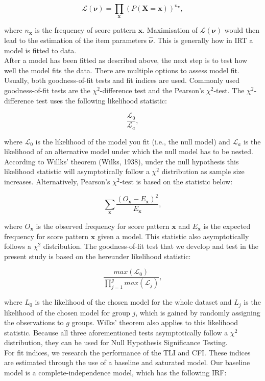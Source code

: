 \documentclass[Royal,sageapa,times,doublespace]{sagej}
\begin{document}
\begin{equation}
\mathcal{L}(\boldsymbol{\nu}) = \prod_{\boldsymbol{x}} (P(\boldsymbol{X} = \boldsymbol{x}))^{n_{\boldsymbol{x}}},
\end{equation}

where $n_{\boldsymbol{x}}$ is the frequency of score pattern $\boldsymbol{x}$. Maximisation of $\mathcal{L}(\boldsymbol{\nu})$ would then lead to the estimation of the item parameters $\boldsymbol{\hat{\nu}}$. This is generally how in IRT a model is fitted to data. \\
\indent After a model has been fitted as described above, the next step is to test how well the model fits the data. There are multiple options to assess model fit. Usually, both goodness-of-fit tests and fit indices are used. Commonly used goodness-of-fit tests are the $\chi^2$-difference test and the Pearson's $\chi^2$-test. The $\chi^2$-difference test uses the following likelihood statistic:

\begin{equation}
\frac{\mathcal{L}_0}{\mathcal{L}_a},
\end{equation}

where $\mathcal{L}_0$ is the likelihood of the model you fit (i.e., the null model) and $\mathcal{L}_a$ is the likelihood of an alternative model under which the null model has to be nested. According to Willks' theorem (Wilks, 1938), under the null hypothesis this likelihood statistic will asymptotically follow a $\chi^2$ distribution as sample size increases. Alternatively, Pearson's $\chi^2$-test is based on the statistic below: 

\begin{equation}
\sum_{\boldsymbol{x}} \frac{(O_{\boldsymbol{x}} - E_{\boldsymbol{x}})^2}{E_{\boldsymbol{x}}},
\end{equation}

where $O_{\boldsymbol{x}}$ is the observed frequency for score pattern $\boldsymbol{x}$ and $E_{\boldsymbol{x}}$ is the expected frequency for score pattern $\boldsymbol{x}$ given a model. This statistic also asymptotically follows a $\chi^2$ distribution. The goodness-of-fit test that we develop and test in the present study is based on the hereunder likelihood statistic: 

\begin{equation}
\frac{max(\mathcal{L}_0)}{\prod_{j = 1}^g max(\mathcal{L}_j)},
\end{equation}
 
where $L_0$ is the likelihood of the chosen model for the whole dataset and $L_j$ is the likelihood of the chosen model for group $j$, which is gained by randomly assigning the observations to $g$ groups. Wilks' theorem also applies to this likelihood statistic. Because all three aforementioned tests asymptotically follow a $\chi^2$ distribution, they can be used for Null Hypothesis Significance Testing. \\
\indent For fit indices, we research the performance of the TLI and CFI. These indices are estimated through the use of a baseline and saturated model. Our baseline model is a complete-independence model, which has the following IRF:
\end{document}
